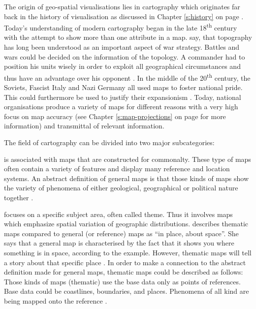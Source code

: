 The origin of geo-spatial visualisations lies in cartography which originates far back in the history of visualisation as discussed in Chapter \ref{s:history} on page \pageref{s:history}. Today's understanding of modern cartography began in the late 18\textsuperscript{th} century with the attempt to show more than one attribute in a map. \citeauthor{Longley2005} say, that topography has long been understood as an important aspect of war strategy. Battles and wars could be decided on the information of the topology. A commander had to position his units wisely in order to exploit all geographical circumstances and thus have an advantage over his opponent .
In the middle of the 20\textsuperscript{th} century, the Soviets, Fascist Italy and Nazi Germany all used maps to foster national pride. This could furthermore be used to justify their expansionism .
Today, national organisations produce a variety of maps for different reasons with a very high focus on map accuracy (see Chapter \ref{s:map-projections} on page \pageref{s:map-projections} for more information) and transmittal of relevant information.

The field of cartography can be divided into two major subcategories:
\begin{enumerate}
 is associated with maps that are constructed for commonalty. These type of maps often contain a variety of features and display many reference and location systems. An abstract definition of general maps is that those kinds of maps show the variety of phenomena of either geological, geographical or political nature together .

 focuses on a specific subject area, often called theme. Thus it involves maps which emphasize spatial variation of geographic distributions. \citeauthor{BartzPetchenik1979} describes thematic maps compared to general (or reference) maps as ``in place, about space''. She says that a general map is characterised by the fact that it shows you where something is in space, according to the example. However, thematic maps will tell a story about that specific place .
In order to make a connection to the abstract definition \citeauthor{Thrower2008} made for general maps, thematic maps could be described as follows:
Those kinds of maps (thematic) use the base data only as points of references. Base data could be coastlines, boundaries, and places. Phenomena of all kind are being mapped onto the reference .
\end{enumerate}

